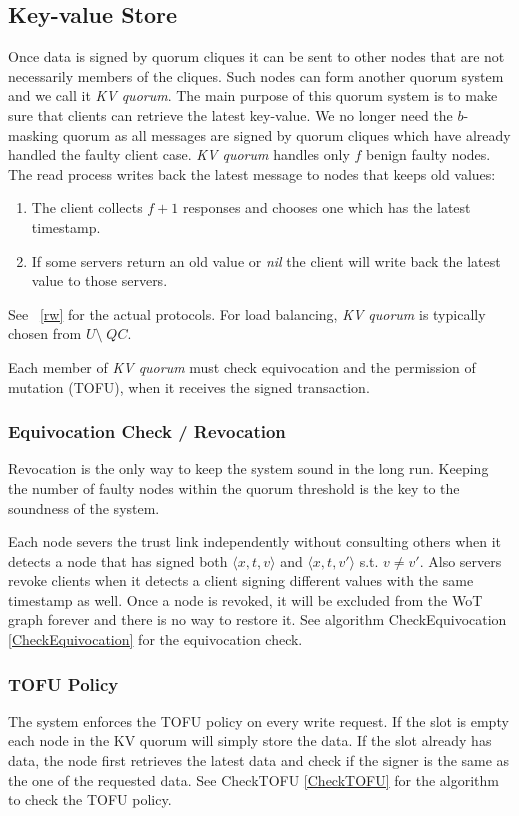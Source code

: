 \subsection{Key-value Store}
Once data is signed by quorum cliques it can be sent to other nodes
that are not necessarily members of the cliques. Such nodes can form
another quorum system and we call it {\em KV quorum}. The main purpose
of this quorum system is to make sure that clients can retrieve the
latest key-value. We no longer need the $b$-masking quorum as all
messages are signed by quorum cliques which have already handled the
faulty client case. {\em KV quorum} handles only $f$ benign faulty
nodes. The {\sf read} process writes back the latest message to nodes
that keeps old values:
\begin{enumerate}
\item The client collects $f + 1$ responses and chooses one which
  has the latest timestamp.
\item If some servers return an old value or {\em
    nil} the client will write back the latest value to those servers.
\end{enumerate}
\ifdefined\ABSTRACT
\else
See ~\ref{rw} for the actual protocols.
\fi
For load balancing, {\em KV quorum} is typically chosen from $U
\setminus\; QC$.

Each member of {\em KV quorum} must check equivocation and the
permission of mutation (TOFU), when it receives the signed
transaction.

\subsubsection*{Equivocation Check / Revocation}
Revocation is the only way to keep the system sound in the long
run. Keeping the number of faulty nodes within the quorum threshold is
the key to the soundness of the system.

Each node severs the trust link independently without consulting
others when it detects a node that has signed both $\langle x,t,v
\rangle$ and $\langle x,t,v' \rangle$ s.t.  $v \neq v'$. Also servers
revoke clients when it detects a client signing different values with
the same timestamp as well. Once a node is revoked, it will be
excluded from the WoT graph forever and there is no way to restore it.
See algorithm {\sf CheckEquivocation} \ref {CheckEquivocation} for
the equivocation check.

\subsubsection*{TOFU Policy}
The system enforces the TOFU policy on every write request. If the
slot is empty each node in the KV quorum will simply store the
data. If the slot already has data, the node first retrieves the
latest data and check if the signer is the same as the one of the
requested data.  See {\sf CheckTOFU} \ref{CheckTOFU} for the
algorithm to check the TOFU policy.

